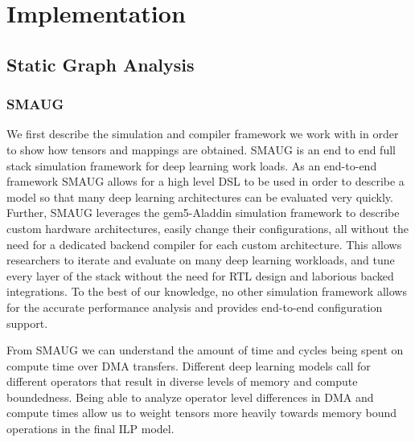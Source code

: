 
\chapter{Implementation} %

\label{Chapter4} %
\section{Static Graph Analysis}
\subsection{SMAUG}

We first describe the simulation and compiler framework we work with in order
to show how tensors and mappings are obtained. SMAUG \cite{smaug} is an end to
end full stack simulation framework for deep learning work loads. As an
end-to-end framework SMAUG allows for a high level DSL to be used in order to
describe a model so that many deep learning architectures can be evaluated very
quickly. Further, SMAUG leverages the gem5-Aladdin \cite{aladdin} simulation
framework to describe custom hardware architectures, easily change their
configurations, all without the need for a dedicated backend compiler for each
custom architecture. This allows researchers to iterate and evaluate on many
deep learning workloads, and tune every layer of the stack without the need for
RTL design and laborious backed integrations. To the best of our knowledge, no
other simulation framework allows for the accurate performance analysis and
provides end-to-end configuration support.

From SMAUG we can understand the amount of time and cycles being spent on compute time
over DMA transfers. Different deep learning models call for different operators that
result in diverse levels of memory and compute boundedness. Being able to
analyze operator level differences in DMA and compute times allow us to weight tensors
more heavily towards memory bound operations in the final ILP model.

